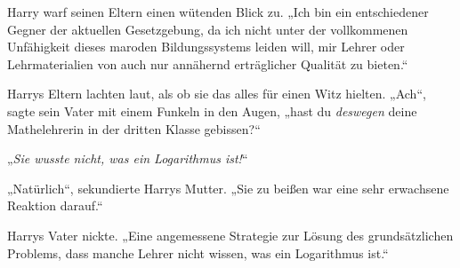 Harry warf seinen Eltern einen wütenden Blick zu.
„Ich bin ein entschiedener Gegner der aktuellen Gesetzgebung, da ich nicht unter der vollkommenen Unfähigkeit dieses maroden Bildungssystems leiden will, mir Lehrer oder Lehrmaterialien von auch nur annähernd erträglicher Qualität zu bieten.“

Harrys Eltern lachten laut, als ob sie das alles für einen Witz hielten.
„Ach“, sagte sein Vater mit einem Funkeln in den Augen, „hast du \emph{deswegen} deine Mathelehrerin in der dritten Klasse gebissen?“

„\emph{Sie wusste nicht, was ein Logarithmus ist!}“%

„Natürlich“, sekundierte Harrys Mutter.
„Sie zu beißen war eine sehr erwachsene Reaktion darauf.“

Harrys Vater nickte.
„Eine angemessene Strategie zur Lösung des grundsätzlichen Problems, dass manche Lehrer nicht wissen, was ein Logarithmus ist.“

